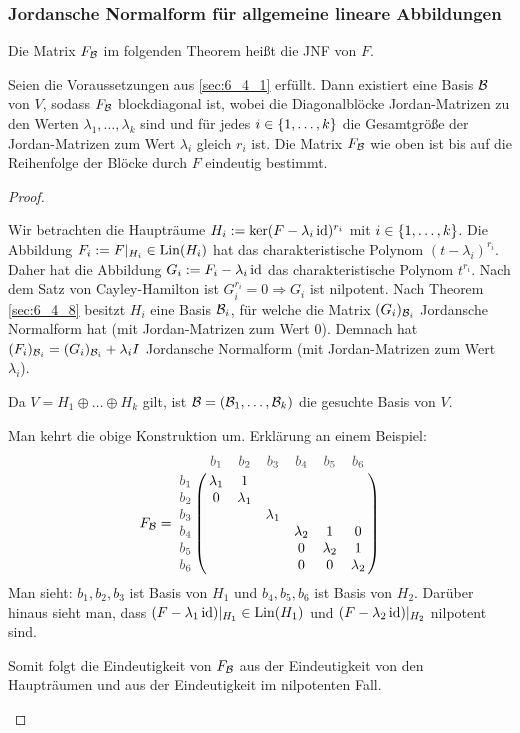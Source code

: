 \subsubsection{Jordansche Normalform für allgemeine lineare Abbildungen}
\label{sec:6_4_9}

Die Matrix $F_\B$ im folgenden Theorem heißt die JNF von $F$. 


\begin{thm}
	Seien die Voraussetzungen aus \ref{sec:6_4_1} erfüllt. Dann existiert eine Basis $ \B $ von $ V $, sodass $ F_\B $ blockdiagonal ist, wobei die Diagonalblöcke Jordan-Matrizen zu den Werten $ \lambda_1, \ldots, \lambda_k $ sind und für jedes $ i \in \{ 1,\ldots,k \} $ die Gesamtgröße der Jordan-Matrizen zum Wert $ \lambda_i $ gleich $ r_i $ ist. Die Matrix $ F_\B $ wie oben ist bis auf die Reihenfolge der Blöcke durch $ F $ eindeutig bestimmt.
\end{thm}
\begin{proof}\
\begin{description}[font = \normalfont]
	\item[Existenz von $ \B $:]
		Wir betrachten die Haupträume $ H_i := \ker(F-\lambda_i\operatorname{id})^{r_i} $ mit $ i \in \{ 1,\ldots,k \} $. Die Abbildung $ F_i := F|_{H_i} \in \operatorname{Lin}(H_i) $ hat das charakteristische Polynom $ (t-\lambda_i)^{r_i} $. Daher hat die Abbildung $ G_i := F_i - \lambda_i \operatorname{id} $ das charakteristische Polynom $ t^{r_i} $. Nach dem Satz von Cayley-Hamilton ist $ G_i^{r_i} = 0 \Rightarrow G_i $ ist nilpotent. Nach Theorem \ref{sec:6_4_8} besitzt $ H_i $ eine Basis $ \mathcal{B}_i $, für welche die Matrix $ (G_i)_{\mathcal{B}_i} $ Jordansche Normalform hat (mit Jordan-Matrizen zum Wert 0). Demnach hat $ (F_i)_{\mathcal{B}_i} = (G_i)_{\mathcal{B}_i} + \lambda_i I $ Jordansche Normalform (mit Jordan-Matrizen zum Wert $ \lambda_i $).
		
		Da $ V = H_1 \oplus \ldots \oplus H_k $ gilt, ist $ \mathcal{B} = (\mathcal{B}_1, \ldots, \mathcal{B}_k) $ die gesuchte Basis von $ V $.
	\item[Eindeutigkeit von $ F_\B $ (Beweisskizze):]
		Man kehrt die obige Konstruktion um. Erklärung an einem Beispiel:
		\begin{equation*}
			F_\B = \bordermatrix{
				& \bordernote{b_1} & \bordernote{b_2} & \bordernote{b_3} & \bordernote{b_4} & \bordernote{b_5} & \bordernote{b_6} \cr
				\bordernote{b_1} & \lambda_1 & 1 &&&& \cr
				\bordernote{b_2} & 0 & \lambda_1 &&&& \cr
				\bordernote{b_3} &&& \lambda_1 &&& \cr
				\bordernote{b_4} &&&& \lambda_2 & 1 & 0 \cr
				\bordernote{b_5} &&&& 0 & \lambda_2 & 1 \cr
				\bordernote{b_6} &&&& 0 & 0 & \lambda_2 \cr
			}
		\end{equation*}
		Man sieht: $ b_1,b_2,b_3 $ ist Basis von $ H_1 $ und $ b_4,b_5,b_6 $ ist Basis von $ H_2 $. Darüber hinaus sieht man, dass $ (F-\lambda_1\operatorname{id})|_{H_1} \in \operatorname{Lin}(H_1) $ und $ (F-\lambda_2\operatorname{id})|_{H_2} $ nilpotent sind.
		
		Somit folgt die Eindeutigkeit von $ F_\B $ aus der Eindeutigkeit von den Haupträumen und aus der Eindeutigkeit im nilpotenten Fall. \qedhere
\end{description}
\end{proof}

